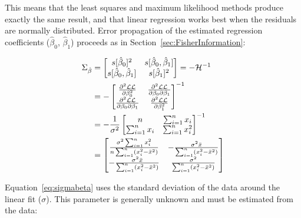 This means that the least squares and maximum likelihood methods
produce exactly the same result, and that linear regression works best
when the residuals are normally distributed. Error propagation of the
estimated regression coefficients ($\hat{\beta}_0$, $\hat{\beta}_1$)
proceeds as in Section~\ref{sec:FisherInformation}:

\begin{equation}
  \begin{split}
    \Sigma_{\hat{\beta}} & = 
  \left[
    \begin{array}{@{}cc@{}}
      s[\hat{\beta}_0]^2 & s[\hat{\beta}_0,\hat{\beta}_1] \\
      s[\hat{\beta}_0,\hat{\beta}_1] & s[\hat{\beta}_1]^2 \\
    \end{array}
    \right] = 
  -\mathcal{H}^{-1} \\
  & =
    -\left[
      \begin{array}{@{}cc@{}}
        \frac{\partial^2{\mathcal{LL}}}{\partial{\beta_0^2}} &
        \frac{\partial^2{\mathcal{LL}}}{\partial{\beta_0}\partial{\beta_1}} \\
        \frac{\partial^2{\mathcal{LL}}}{\partial{\beta_0}\partial{\beta_1}} &
        \frac{\partial^2{\mathcal{LL}}}{\partial{\beta_1^2}}
      \end{array}
      \right]^{-1} \\
    & = -\frac{1}{\sigma^2}
    \left[
      \begin{array}{@{}cc@{}}
        n & \sum_{i=1}^{n}x_i \\
        \sum_{i=1}^{n}x_i & \sum_{i=1}^{n}x_i^2
      \end{array}
      \right]^{-1} \\
    & =
    \left[
      \begin{array}{@{}cc@{}}
        \frac{\sigma^2\sum_{i=1}^{n}x_i^2}{n\sum_{i=1}^{n}(x_i^2-\bar{x}^2)} &
        -\frac{\sigma^2\bar{x}}{\sum_{i=1}^{n}(x_i^2-\bar{x}^2)} \\
        -\frac{\sigma^2\bar{x}}{\sum_{i=1}^{n}(x_i^2-\bar{x}^2)} &
        \frac{\sigma^2}{\sum_{i=1}^{n}(x_i^2-\bar{x}^2)}
      \end{array}
      \right]
  \end{split}
  \label{eq:sigmabeta}
\end{equation}

Equation~\ref{eq:sigmabeta} uses the standard deviation of the data
around the linear fit ($\sigma$). This parameter is generally unknown
and must be estimated from the data:

